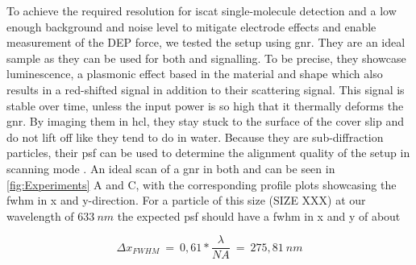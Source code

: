     
    To achieve the required resolution for \gls{iscat} single-molecule detection and a low enough background and noise level to mitigate electrode effects and enable measurement of the \gls{DEP} force, we tested the setup using \gls{gnr}. They are an ideal sample as they can be used for both \fl and \scat signalling. To be precise, they showcase luminescence, a plasmonic effect based in the material and shape which also results in a red-shifted signal in addition to their scattering signal\cite{gaiduk2011correlated}. This signal is stable over time, unless the input power is so high that it thermally deforms the \gls{gnr}. By imaging them in \gls{hcl}, they stay stuck to the surface of the cover slip and do not lift off like they tend to do in water. Because they are sub-diffraction particles, their \gls{psf} can be used to determine the alignment quality of the setup in scanning mode \cite{cole2011measuring}. An ideal scan of a \gls{gnr} in both \scat and \fl can be seen in \cref{fig:Experiments} A and C, with the corresponding profile plots showcasing the \gls{fwhm} in x and y-direction. For a particle of this size (SIZE XXX) at our wavelength of $633~nm$ the expected \gls{psf} should have a \gls{fwhm} in x and y of about
    
    \begin{equation}
    	\Delta x_{FWHM}~=~0,61*\frac{\lambda}{NA}~=~275,81~nm
    \end{equation}
    
